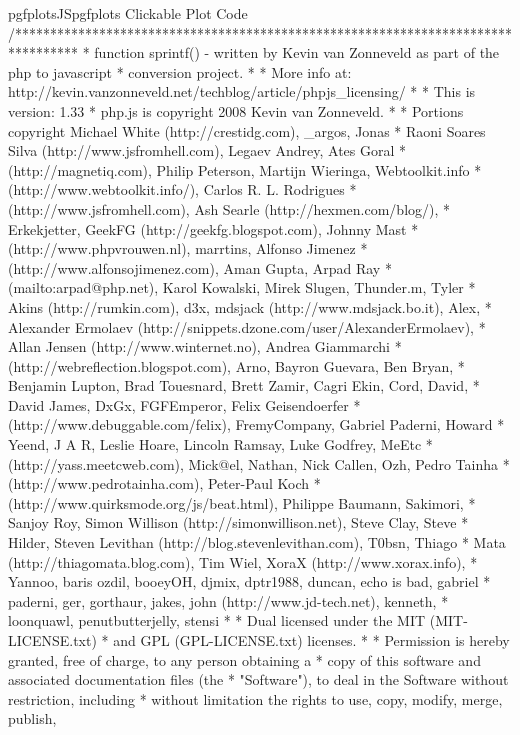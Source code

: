 \begin{insDLJS}[processAnnotatedPlot]{pgfplotsJS}{pgfplots Clickable Plot Code}
/*********************************************************************************
 * function sprintf() - written by Kevin van Zonneveld as part of the php to javascript 
 * conversion project.
 * 
 * More info at: http://kevin.vanzonneveld.net/techblog/article/phpjs_licensing/
 * 
 * This is version: 1.33
 * php.js is copyright 2008 Kevin van Zonneveld.
 * 
 * Portions copyright Michael White (http://crestidg.com), _argos, Jonas
 * Raoni Soares Silva (http://www.jsfromhell.com), Legaev Andrey, Ates Goral
 * (http://magnetiq.com), Philip Peterson, Martijn Wieringa, Webtoolkit.info
 * (http://www.webtoolkit.info/), Carlos R. L. Rodrigues
 * (http://www.jsfromhell.com), Ash Searle (http://hexmen.com/blog/),
 * Erkekjetter, GeekFG (http://geekfg.blogspot.com), Johnny Mast
 * (http://www.phpvrouwen.nl), marrtins, Alfonso Jimenez
 * (http://www.alfonsojimenez.com), Aman Gupta, Arpad Ray
 * (mailto:arpad@php.net), Karol Kowalski, Mirek Slugen, Thunder.m, Tyler
 * Akins (http://rumkin.com), d3x, mdsjack (http://www.mdsjack.bo.it), Alex,
 * Alexander Ermolaev (http://snippets.dzone.com/user/AlexanderErmolaev),
 * Allan Jensen (http://www.winternet.no), Andrea Giammarchi
 * (http://webreflection.blogspot.com), Arno, Bayron Guevara, Ben Bryan,
 * Benjamin Lupton, Brad Touesnard, Brett Zamir, Cagri Ekin, Cord, David,
 * David James, DxGx, FGFEmperor, Felix Geisendoerfer
 * (http://www.debuggable.com/felix), FremyCompany, Gabriel Paderni, Howard
 * Yeend, J A R, Leslie Hoare, Lincoln Ramsay, Luke Godfrey, MeEtc
 * (http://yass.meetcweb.com), Mick@el, Nathan, Nick Callen, Ozh, Pedro Tainha
 * (http://www.pedrotainha.com), Peter-Paul Koch
 * (http://www.quirksmode.org/js/beat.html), Philippe Baumann, Sakimori,
 * Sanjoy Roy, Simon Willison (http://simonwillison.net), Steve Clay, Steve
 * Hilder, Steven Levithan (http://blog.stevenlevithan.com), T0bsn, Thiago
 * Mata (http://thiagomata.blog.com), Tim Wiel, XoraX (http://www.xorax.info),
 * Yannoo, baris ozdil, booeyOH, djmix, dptr1988, duncan, echo is bad, gabriel
 * paderni, ger, gorthaur, jakes, john (http://www.jd-tech.net), kenneth,
 * loonquawl, penutbutterjelly, stensi
 * 
 * Dual licensed under the MIT (MIT-LICENSE.txt)
 * and GPL (GPL-LICENSE.txt) licenses.
 * 
 * Permission is hereby granted, free of charge, to any person obtaining a
 * copy of this software and associated documentation files (the
 * "Software"), to deal in the Software without restriction, including
 * without limitation the rights to use, copy, modify, merge, publish,

\end{insDLJS}
